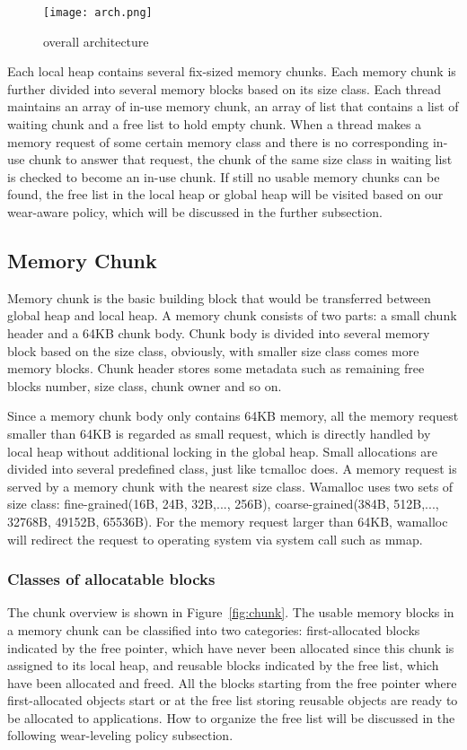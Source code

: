 \documentclass{vldb}
\begin{document}
\begin{figure}
\centering
\texttt{[image: arch.png]}
\caption{overall architecture}
\label{fig:arch}
\end{figure}

Each local heap contains several fix-sized memory chunks.
Each memory chunk is further divided into several memory blocks based on its size class.
Each thread maintains an array of in-use memory chunk, an array of list that contains a list of waiting chunk and a free list to hold empty chunk.
When a thread makes a memory request of some certain memory class and there is no corresponding in-use chunk to answer that request,
the chunk of the same size class in waiting list is checked to become an in-use chunk. 
If still no usable memory chunks can be found,
the free list in the local heap or global heap will be visited based on our wear-aware policy,
which will be discussed in the further subsection.

\subsection{Memory Chunk}

Memory chunk is the basic building block that would be transferred between global heap and local heap. 
A memory chunk consists of two parts: a small chunk header and a 64KB chunk body. 
Chunk body is divided into several memory block based on the size class,
obviously, with smaller size class comes more memory blocks. 
Chunk header stores some metadata such as remaining free blocks number, size class, chunk owner and so on.

Since a memory chunk body only contains 64KB memory, all the memory request smaller than 64KB is regarded as small request,
which is directly handled by local heap without additional locking in the global heap.
Small allocations are divided into several predefined class, just like tcmalloc does. 
A memory request is served by a memory chunk with the nearest size class. 
Wamalloc uses two sets of size class: fine-grained(16B, 24B, 32B,..., 256B), coarse-grained(384B, 512B,..., 32768B, 49152B, 65536B). 
For the memory request larger than 64KB, wamalloc will redirect the request to operating system via system call such as mmap.

\subsubsection{Classes of allocatable blocks}
The chunk overview is shown in Figure~\ref{fig:chunk}.
The usable memory blocks in a memory chunk can be classified into two categories:
first-allocated blocks indicated by the free pointer, which have never been allocated since this chunk is assigned to its local heap,
and reusable blocks indicated by the free list, which have been allocated and freed.
All the blocks starting from the free pointer where first-allocated objects start or at the free list storing reusable objects are ready to be allocated to applications. 
How to organize the free list will be discussed in the following wear-leveling policy subsection.
\end{document}
